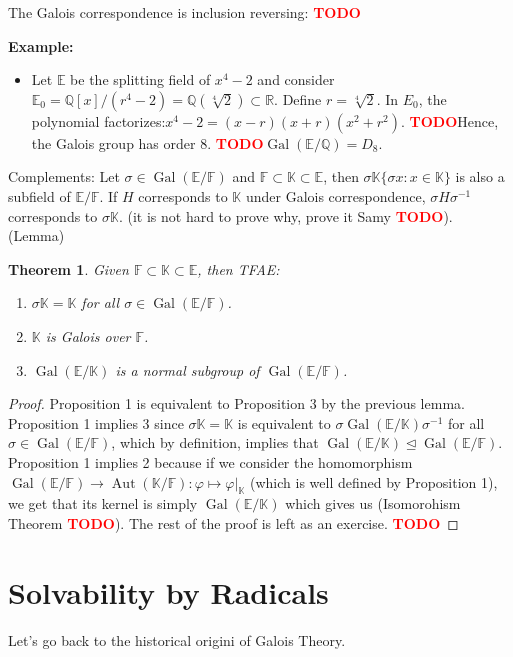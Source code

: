 \documentclass{article}
\theoremstyle{plain}
\newtheorem{theorem}{Theorem}[subsection]
\theoremstyle{definition}
\newcommand{\R}{\mathbb{R}}
\newcommand{\Q}{\mathbb{Q}}
\newcommand{\F}{\mathbb{F}}
\newcommand{\E}{\mathbb{E}}
\newcommand{\K}{\mathbb{K}}
\DeclareMathOperator{\Aut}{Aut}
\DeclareMathOperator{\Gal}{Gal}
\newcommand{\td}{\textcolor{red}{\textbf{TODO}}}
\newenvironment{example}{\noindent\textbf{Example:} \vspace{-0.2cm}\begin{itemize}}{\end{itemize}}
\begin{document}
The Galois correspondence is inclusion reversing: \td

\begin{example}
    \item Let $\E$ be the splitting field of $x^4 - 2$ and consider $\E_0 = \Q[x]/(r^4 - 2) = \Q(\sqrt[4]{2}) \subset \R$. Define $r = \sqrt[4]{2}$. In $E_0$, the polynomial factorizes:$x^4 - 2 = (x - r)(x + r)(x^2 + r^2)$. \td Hence, the Galois group has order 8. \td $\Gal(\E / \Q) = D_8$. 
\end{example}

Complements: Let $\sigma \in \Gal(\E / \F)$ and $\F \subset \K \subset \E$, then $\sigma \K \{\sigma x : x \in \K\}$ is also a subfield of $\E / \F$. If $H$ corresponds to $\K$ under Galois correspondence, $\sigma H \sigma^{-1}$ corresponds to $\sigma \K$. (it is not hard to prove why, prove it Samy \td). (Lemma)

\begin{theorem}
    Given $\F \subset \K \subset \E$, then TFAE:
    \begin{enumerate}
        \item $\sigma \K = \K$ for all $\sigma \in \Gal(\E / \F)$.
        \item $\K$ is Galois over $\F$.
        \item $\Gal(\E / \K)$ is a normal subgroup of $\Gal(\E / \F)$.
    \end{enumerate}
\end{theorem}

\begin{proof}
    Proposition 1 is equivalent to Proposition 3 by the previous lemma. Proposition 1 implies 3 since $\sigma \K = \K$ is equivalent to $\sigma \Gal(\E / \K) \sigma^{-1}$ for all $\sigma \in \Gal(\E / \F)$, which by definition, implies that $\Gal(\E / \K) \trianglelefteq \Gal(\E / \F)$. Proposition 1 implies 2 because if we consider the homomorphism $\Gal(\E / \F) \to \Aut(\K / \F) : \varphi \mapsto \varphi|_{\K}$ (which is well defined by Proposition 1), we get that its kernel is simply $\Gal(\E / \K)$ which gives us (Isomorohism Theorem \td). The rest of the proof is left as an exercise. \td 
\end{proof}

\section{Solvability by Radicals}

Let's go back to the historical origini of Galois Theory.
\end{document}
